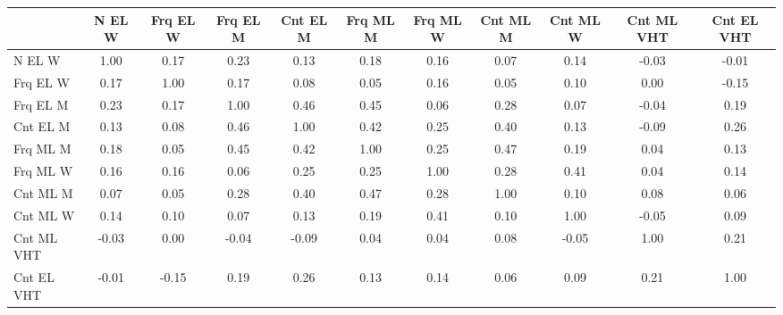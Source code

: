 
\begin{tabular}{l|c|c|c|c|c|c|c|c|c|c}
\hline
  & N EL W & Frq EL W & Frq EL M & Cnt EL M & Frq ML M & Frq ML W & Cnt ML M & Cnt ML W & Cnt ML VHT & Cnt EL VHT\\
\hline
N EL W & 1.00 & 0.17 & 0.23 & 0.13 & 0.18 & 0.16 & 0.07 & 0.14 & -0.03 & -0.01\\
\hline
Frq EL W & 0.17 & 1.00 & 0.17 & 0.08 & 0.05 & 0.16 & 0.05 & 0.10 & 0.00 & -0.15\\
\hline
Frq EL M & 0.23 & 0.17 & 1.00 & 0.46 & 0.45 & 0.06 & 0.28 & 0.07 & -0.04 & 0.19\\
\hline
Cnt EL M & 0.13 & 0.08 & 0.46 & 1.00 & 0.42 & 0.25 & 0.40 & 0.13 & -0.09 & 0.26\\
\hline
Frq ML M & 0.18 & 0.05 & 0.45 & 0.42 & 1.00 & 0.25 & 0.47 & 0.19 & 0.04 & 0.13\\
\hline
Frq ML W & 0.16 & 0.16 & 0.06 & 0.25 & 0.25 & 1.00 & 0.28 & 0.41 & 0.04 & 0.14\\
\hline
Cnt ML M & 0.07 & 0.05 & 0.28 & 0.40 & 0.47 & 0.28 & 1.00 & 0.10 & 0.08 & 0.06\\
\hline
Cnt ML W & 0.14 & 0.10 & 0.07 & 0.13 & 0.19 & 0.41 & 0.10 & 1.00 & -0.05 & 0.09\\
\hline
Cnt ML VHT & -0.03 & 0.00 & -0.04 & -0.09 & 0.04 & 0.04 & 0.08 & -0.05 & 1.00 & 0.21\\
\hline
Cnt EL VHT & -0.01 & -0.15 & 0.19 & 0.26 & 0.13 & 0.14 & 0.06 & 0.09 & 0.21 & 1.00\\
\hline
\end{tabular}
